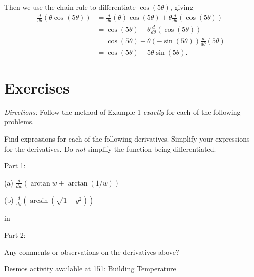 \documentclass{ximera}
\newcommand{\pskip}{\vskip 0.1 in}
\begin{document}
\begin{example}
\begin{explanation}
Then we use the chain rule to differentiate $\cos(5\theta)$, giving
\begin{align*}
       \frac{d}{d\theta} \left( \theta \cos (5\theta) \right) &= \frac{d}{d\theta} \left(  \theta \right) \cos (5\theta) + \theta \frac{d}{d\theta} \left(  \cos (5\theta) \right)  \\ 
                          &= \cos(5\theta) + \theta  \frac{d}{d\theta} \left(  \cos (5\theta) \right)  \\
                         &= \cos(5\theta) + \theta (-\sin (5\theta)) \frac{d}{d\theta} \left( 5\theta  \right)  \\
                         &= \cos (5\theta) - 5 \theta \sin (5\theta) .
\end{align*}


\end{explanation}


\end{example}



\section*{Exercises}

\emph{Directions:} Follow the method of Example 1 \emph{exactly} for each of the following problems.


\begin{question}  \label{Q:MMMDNFD}
Find expressions for each of the following derivatives. Simplify your expressions for the derivatives. Do \emph{not} simplify the function being differentiated.

Part 1:

(a)  $\frac{d}{dw} \left( \arctan w + \arctan (1/w) \right)$ 

(b) $\frac{d}{dy} \left(  \arcsin\left(  \sqrt{1-y^2} \right) \right)$

\pskip

Part 2:

Any comments or observations on the derivatives above?


\end{question}


\begin{question}  \label{Q:Dfrg4ttgg}

\begin{onlineOnly}
    \begin{center}
\end{center}
\end{onlineOnly}

Desmos activity available at \href{https://www.desmos.com/calculator/zjqsdhvz4p}{151: Building Temperature}

\end{question}
\end{document}
